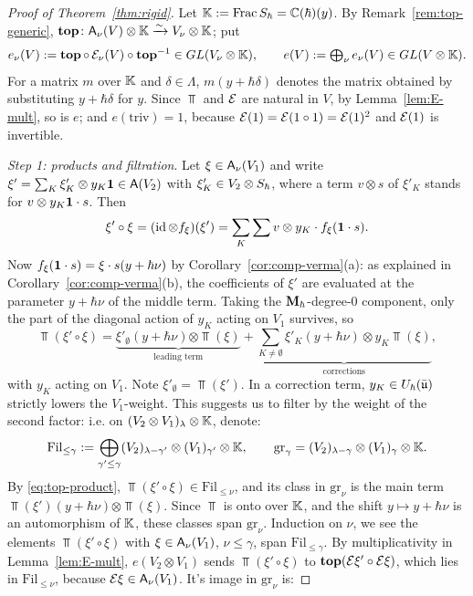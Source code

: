 \documentclass{article}
\theoremstyle{plain}
\theoremstyle{definition}
\theoremstyle{remark}
\numberwithin{equation}{section}
\begin{document}
\begin{proof}[Proof of Theorem~\ref{thm:rigid}] 
Let $\mathbb K:=\operatorname{Frac}S_\hbar=\mathbb{C}(\hbar)(y)$. By Remark~\ref{rem:top-generic}, $\operatorname{\mathbf{top}}\colon\mathsf A_\nu(V)\otimes\mathbb K\xrightarrow{\sim}V_\nu\otimes\mathbb K$; put
\[
e_\nu(V):=\operatorname{\mathbf{top}}\circ\,\mathcal E_\nu(V)\circ\operatorname{\mathbf{top}}^{-1}\in GL(V_\nu\otimes\mathbb K),\qquad e(V):=\textstyle\bigoplus_\nu e_\nu(V)\in GL(V\otimes\mathbb K).
\]
For a matrix $m$ over $\mathbb K$ and $\delta\in\Lambda$, $m(y+\hbar\delta)$ denotes the matrix obtained by substituting $y+\hbar\delta$ for $y$. Since $\Top$ and $\mathcal E$ are natural in $V$, by Lemma~\ref{lem:E-mult}, so is $e$; and $e(\mathrm{triv})=1$, because $\mathcal E(1)=\mathcal E(1\circ1)=\mathcal E(1)^2$ and $\mathcal E(1)$ is invertible.

\emph{Step 1: products and filtration}. Let $\xi\in\mathsf A_\nu(V_1)$ and write $\xi'=\sum_K\xi'_K\otimes y_K\mathbf 1\in\mathsf A(V_2)$ with $\xi'_K\in V_2\otimes S_\hbar$, where a term $v\otimes s$ of $\xi'_K$ stands for $v\otimes y_K\mathbf 1\cdot s$. Then
\[
\xi'\circ\xi=(\operatorname{id}\otimes f_\xi)(\xi')=\sum_K\sum v\otimes y_K\cdot f_\xi(\mathbf 1\cdot s).
\]
Now $f_\xi(\mathbf 1\cdot s)=\xi\cdot s(y+\hbar\nu)$ by Corollary~\ref{cor:comp-verma}(a): as explained in Corollary~\ref{cor:comp-verma}(b), the coefficients of $\xi'$ are evaluated at the parameter $y+\hbar\nu$ of the middle term. Taking the $\mathbf{M}_\hbar$-degree-$0$ component, only the part of the diagonal action of $y_K$ acting on $V_1$ survives, so
\begin{equation}\label{eq:top-product}
\Top(\xi'\circ\xi)=\underbrace{\xi'_\emptyset(y+\hbar\nu)\otimes\Top(\xi)}_{\text{leading term}}+\underbrace{\sum_{K\neq\emptyset}\xi'_K(y+\hbar\nu)\otimes y_K\Top(\xi)}_{\text{corrections}},
\end{equation}
with $y_K$ acting on $V_1$. Note $\xi'_\emptyset=\Top(\xi')$. In a correction term, $y_K\in U_\hbar(\bar{\mathfrak u})$ strictly lowers the $V_1$-weight. This suggests us to filter by the weight of the second factor: i.e. on $(V_2\otimes V_1)_\lambda\otimes\mathbb K$, denote:
\[
\mathrm{Fil}_{\le\gamma}:=\bigoplus_{\gamma'\le\gamma}(V_2)_{\lambda-\gamma'}\otimes(V_1)_{\gamma'}\otimes\mathbb K,\qquad\mathrm{gr}_\gamma=(V_2)_{\lambda-\gamma}\otimes(V_1)_\gamma\otimes\mathbb K .
\]
By \eqref{eq:top-product}, $\Top(\xi'\circ\xi)\in\mathrm{Fil}_{\le\nu}$, and its class in $\mathrm{gr}_\nu$ is the main term $\Top(\xi')(y+\hbar\nu)\otimes\Top(\xi)$. Since $\Top$ is onto over $\mathbb K$, and the shift $y\mapsto y+\hbar\nu$ is an automorphism of $\mathbb K$, these classes span $\mathrm{gr}_\nu$. Induction on $\nu$, we see the elements $\Top(\xi'\circ\xi)$ with $\xi\in\mathsf A_\nu(V_1)$, $\nu\le\gamma$, span $\mathrm{Fil}_{\le\gamma}$. By multiplicativity in Lemma~\ref{lem:E-mult}, $e(V_2\otimes V_1)$ sends $\Top(\xi'\circ\xi)$ to $\operatorname{\mathbf{top}}(\mathcal E\xi'\circ\mathcal E\xi)$, which lies in $\mathrm{Fil}_{\le\nu}$, because $\mathcal E\xi\in\mathsf A_\nu(V_1)$. It's image in $\mathrm{gr}_\nu$ is:

\end{proof}
\end{document}
